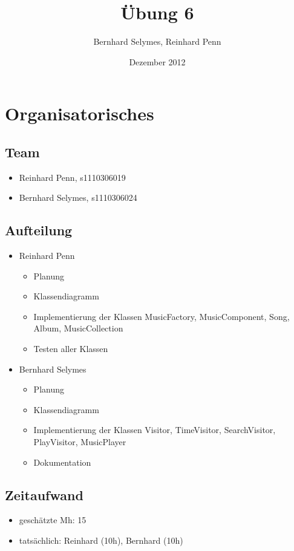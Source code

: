 \documentclass[12pt,a4paper]{article}
\begin{document}
\title{Übung 6}
\author{Bernhard Selymes, Reinhard Penn}
\date{Dezember 2012}

\normalsize

\newcommand{\CodePath}{../MusicPlayer/MusicPlayer/}

\section{Organisatorisches}

\subsection{Team}
	\begin {itemize} 
		\item Reinhard Penn, s1110306019 
		\item Bernhard Selymes, s1110306024
	\end {itemize}

\subsection{Aufteilung}
	\begin {itemize} 
		\item Reinhard Penn
			\begin {itemize}
				\item Planung
				\item Klassendiagramm
				\item Implementierung der Klassen MusicFactory, MusicComponent, Song, Album, MusicCollection
				\item Testen aller Klassen
			\end {itemize}
		\item Bernhard Selymes
			\begin {itemize}
				\item Planung
				\item Klassendiagramm
				\item Implementierung der Klassen Visitor, TimeVisitor, SearchVisitor, PlayVisitor, MusicPlayer
				\item Dokumentation		
			\end {itemize}
	\end {itemize}


\subsection{Zeitaufwand}
	\begin {itemize}
		\item geschätzte Mh: 15
		\item tatsächlich: Reinhard (10h), Bernhard  (10h)
	\end {itemize}
\end{document}
